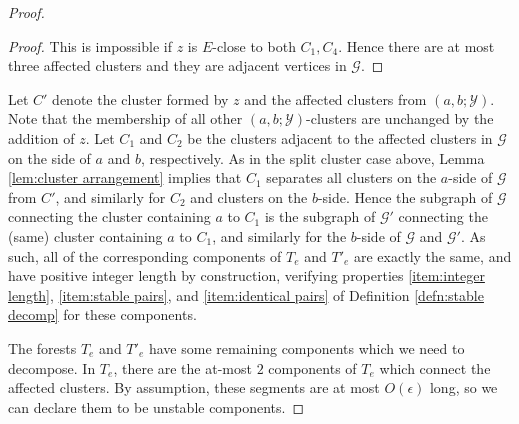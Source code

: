 \documentclass[10pt,a4paper]{amsart}
\newcommand{\calG}{\mathcal{G}}
\newcommand{\calY}{\mathcal{Y}}
\begin{document}
\begin{proof}
\begin{proof}
This is impossible if $z$ is $E$-close to both $C_1,C_4$.  Hence there are at most three affected clusters and they are adjacent vertices in $\calG$.
\end{proof}



Let $C'$ denote the cluster formed by $z$ and the affected clusters from $(a,b;\calY)$.  Note that the membership of all other $(a,b;\calY)$-clusters are unchanged by the addition of $z$.  Let $C_1$ and $C_2$ be the clusters adjacent to the affected clusters in $\calG$ on the side of $a$ and $b$, respectively.  As in the split cluster case above, Lemma \ref{lem:cluster arrangement} implies that $C_1$ separates all clusters on the $a$-side of $\calG$ from $C'$, and similarly for $C_2$ and clusters on the $b$-side.  Hence the subgraph of $\calG$ connecting the cluster containing $a$ to $C_1$ is the subgraph of $\calG'$ connecting the (same) cluster containing $a$ to $C_1$, and similarly for the $b$-side of $\calG$ and $\calG'$.  As such, all of the corresponding components of $T_e$ and $T'_e$ are exactly the same, and have positive integer length by construction, verifying properties \eqref{item:integer length}, \eqref{item:stable pairs}, and \eqref{item:identical pairs} of Definition \ref{defn:stable decomp} for these components.

The forests $T_e$ and $T'_e$ have some remaining components which we need to decompose.  In $T_e$, there are the at-most $2$ components of $T_e$ which connect the affected clusters.  By assumption, these segments are at most $O(\epsilon)$ long, so we can declare them to be unstable components.


\end{proof}
\end{document}
